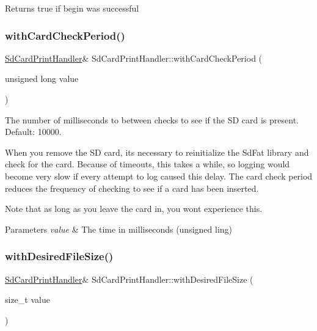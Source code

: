 \begin{DoxyReturn}{Returns}
true if begin was successful 
\end{DoxyReturn}
\mbox{\label{class_sd_card_print_handler_a0ddcaed71e575f70e5a5240cd5765002}} 
\subsubsection{\texorpdfstring{with\+Card\+Check\+Period()}{withCardCheckPeriod()}}
{\footnotesize\ttfamily \mbox{\hyperlink{class_sd_card_print_handler}{Sd\+Card\+Print\+Handler}}\& Sd\+Card\+Print\+Handler\+::with\+Card\+Check\+Period (\begin{DoxyParamCaption}\item[{unsigned long}]{value }\end{DoxyParamCaption})\hspace{0.3cm}{\ttfamily [inline]}}



The number of milliseconds to between checks to see if the SD card is present. Default\+: 10000. 

When you remove the SD card, it\textquotesingle{}s necessary to reinitialize the Sd\+Fat library and check for the card. Because of timeouts, this takes a while, so logging would become very slow if every attempt to log caused this delay. The card check period reduces the frequency of checking to see if a card has been inserted.

Note that as long as you leave the card in, you won\textquotesingle{}t experience this.


\begin{DoxyParams}{Parameters}
{\em value} & The time in milliseconds (unsigned ling) \\
\hline
\end{DoxyParams}
\mbox{\label{class_sd_card_print_handler_a72ba4425d0d1551a2ad4513f2bfaefa5}} 
\subsubsection{\texorpdfstring{with\+Desired\+File\+Size()}{withDesiredFileSize()}}
{\footnotesize\ttfamily \mbox{\hyperlink{class_sd_card_print_handler}{Sd\+Card\+Print\+Handler}}\& Sd\+Card\+Print\+Handler\+::with\+Desired\+File\+Size (\begin{DoxyParamCaption}\item[{size\+\_\+t}]{value }\end{DoxyParamCaption})\hspace{0.3cm}{\ttfamily [inline]}}



